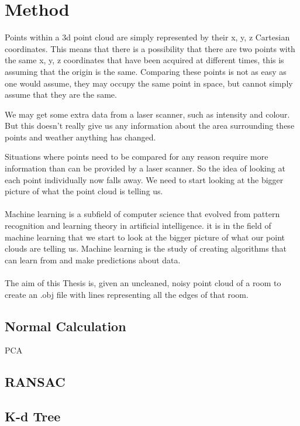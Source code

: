 \chapter{Method}
	
	Points within a 3d point cloud are simply represented by their x, y, z Cartesian coordinates. This means that there is a possibility that there are two points with the same x, y, z coordinates that have been acquired at different times, this is assuming that the origin is the same. Comparing these points is not as easy as one would assume, they may occupy the same point in space, but cannot simply assume that they are the same.
	
	We may get some extra data from a laser scanner, such as intensity and colour. But this doesn't really give us any information about the area surrounding these points and weather anything has changed.
	
	Situations where points need to be compared for any reason require more information than can be provided by a laser scanner. So the idea of looking at each point individually now falls away. We need to start looking at the bigger picture of what the point cloud is telling us.\\
	\\
	Machine learning is a subfield of computer science that evolved from pattern recognition and learning theory in artificial intelligence. it is in the field of machine learning that we start to look at the bigger picture of what our point clouds are telling us. Machine learning is the study of creating algorithms that can learn from and make predictions about data.\\
	\\
	The aim of this Thesis is, given an uncleaned, noisy point cloud of a room to create an .obj file with lines representing all the edges of that room.
	
	
	\section{Normal Calculation}
		PCA
		
	\section{RANSAC}
		
	\section{K-d Tree}
		
